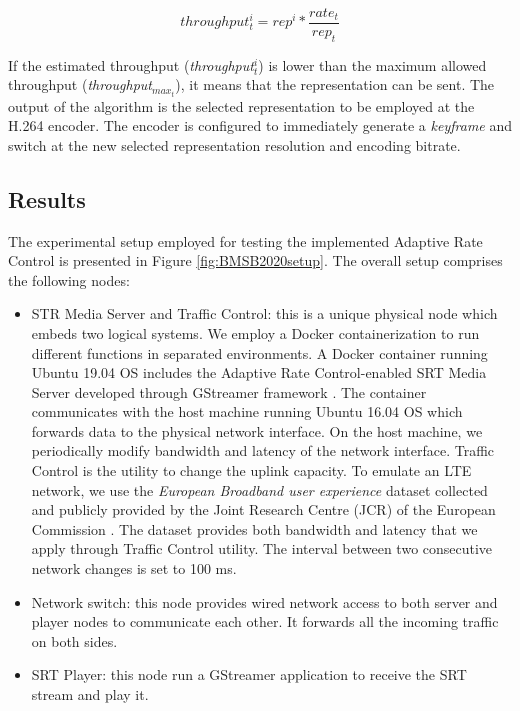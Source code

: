 \begin{equation}
\label{eq:BMSB2020minBW}
throughput^{i}_{t} = rep^i * \frac{rate_{t}}{rep_{t}}
\end{equation}

If the estimated throughput (\textit{throughput$_t^i$}) is lower than the maximum allowed throughput (\textit{throughput$_{max_t}$}), it means that the representation can be sent. The output of the algorithm is the selected representation to be employed at the H.264 encoder. The encoder is configured to immediately generate a \textit{keyframe} and switch at the new selected representation resolution and encoding bitrate.

\subsection{Results}
\label{sec:BMSB2020results}

The experimental setup employed for testing the implemented Adaptive Rate Control is presented in Figure \ref{fig:BMSB2020setup}. The overall setup comprises the following nodes:
\begin{itemize}
	\item STR Media Server and Traffic Control: this is a unique physical node which embeds two logical systems. We employ a Docker containerization \cite{merkel2014} to run different functions in separated environments. A Docker container running Ubuntu 19.04 OS includes the Adaptive Rate Control-enabled SRT Media Server developed through GStreamer framework \cite{gstreamer}. The container communicates with the host machine running Ubuntu 16.04 OS which forwards data to the physical network interface. On the host machine, we periodically modify bandwidth and latency of the network interface. Traffic Control \cite{tc} is the utility to change the uplink capacity. To emulate an LTE network, we use the \textit{European Broadband user experience} dataset collected and publicly provided by the Joint Research Centre (JCR) of the European Commission \cite{chawdhry2016}. The dataset provides both bandwidth and latency that we apply through Traffic Control utility. The interval between two consecutive network changes is set to 100 ms. %
	\item Network switch: this node provides wired network access to both server and player nodes to communicate each other. It forwards all the incoming traffic on both sides.
	\item SRT Player: this node run a GStreamer application to receive the SRT stream and play it.
\end{itemize}

